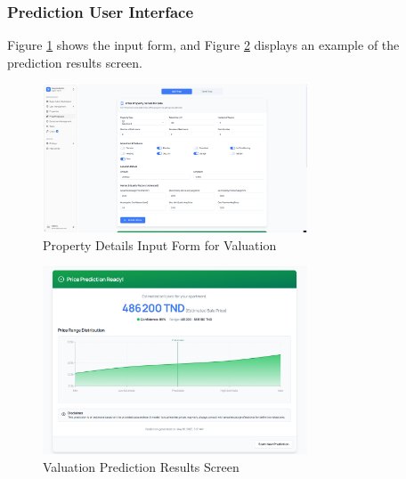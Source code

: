 \newpage

\subsubsection{Prediction User Interface}
Figure \ref{fig:prediction-form} shows the input form, and Figure \ref{fig:prediction-results} displays an example of the prediction results screen.

\begin{figure}[htbp]
        \centering
        \includegraphics[width=0.7\textwidth]{images/screenshot_form_predition.png}
        \caption{Property Details Input Form for Valuation}
        \label{fig:prediction-form}
\end{figure}

\begin{figure}[htbp]
        \centering
        \includegraphics[width=0.7\textwidth]{images/screenshot_predctionscreen.png}
        \caption{Valuation Prediction Results Screen}
        \label{fig:prediction-results}
\end{figure}

